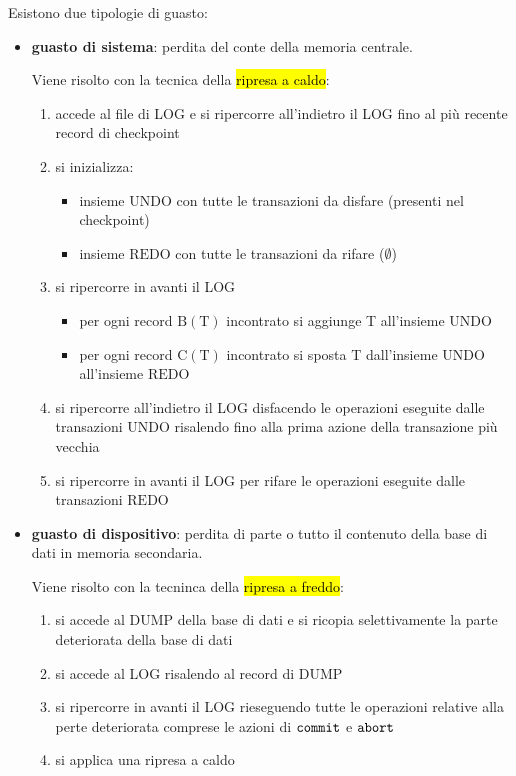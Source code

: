 Esistono due tipologie di guasto:
\begin{itemize}[label=$\triangleright$, itemsep=\medskipamount]
  \item \textbf{guasto di sistema}: perdita del conte della memoria centrale.
  
  Viene risolto con la tecnica della \hl{ripresa a caldo}:
  \begin{enumerate}[itemsep=\smallskipamount]
    \item accede al file di LOG e si ripercorre all’indietro il LOG fino al più recente record di checkpoint
    \item si inizializza:
    \begin{itemize}[label=$\diamond$, itemsep=\smallskipamount]
      \item insieme $\mathrm{UNDO}$ con tutte le transazioni da disfare (presenti nel checkpoint)
      \item insieme $\mathrm{REDO}$ con tutte le transazioni da rifare ($\emptyset$)
    \end{itemize}
    \item si ripercorre in avanti il LOG
    \begin{itemize}[label=$\circ$, itemsep=\smallskipamount]
      \item per ogni record $\mathrm{B(T)}$ incontrato si aggiunge T all’insieme $\mathrm{UNDO}$
      \item per ogni record $\mathrm{C(T)}$ incontrato si sposta T dall’insieme $\mathrm{UNDO}$ all’insieme $\mathrm{REDO}$
    \end{itemize}
    \item si ripercorre all'indietro il LOG disfacendo le operazioni eseguite dalle transazioni $\mathrm{UNDO}$ risalendo fino alla prima azione della transazione più vecchia
    \item si ripercorre in avanti il LOG per rifare le operazioni eseguite dalle transazioni $\mathrm{REDO}$
  \end{enumerate}
  \item \textbf{guasto di dispositivo}: perdita di parte o tutto il contenuto della base di dati in memoria secondaria.
  
  Viene risolto con la tecninca della \hl{ripresa a freddo}:
  \begin{enumerate}[itemsep=\smallskipamount]
    \item si accede al $\mathrm{DUMP}$ della base di dati e si ricopia selettivamente la parte deteriorata della base di dati
    \item si accede al LOG risalendo al record di $\mathrm{DUMP}$
    \item si ripercorre in avanti il LOG rieseguendo tutte le operazioni relative alla perte deteriorata comprese le azioni di $\verb|commit|$ e $\verb|abort|$
    \item si applica una ripresa a caldo
  \end{enumerate}
\end{itemize}

